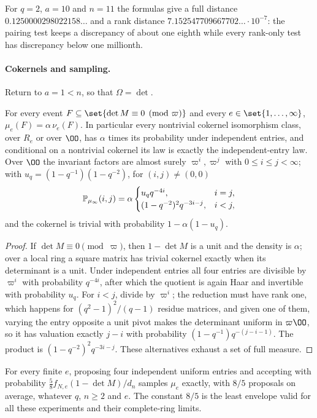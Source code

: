 For $q=2$, $a=10$ and $n=11$ the formulas give a full distance $0.1250000298022158\ldots$ and a
rank distance $7.152547709667702\ldots\cdot10^{-7}$: the pairing test keeps a discrepancy of about
one eighth while every rank-only test has discrepancy below one millionth.

\paragraph{Cokernels and sampling.} Return to $a=1<n$, so that $\Omega=\det$.

\begin{corollary}\label{spn:cor:padic-cokernel}
For every event $F\subseteq\set{\det M\equiv0\pmod\varpi}$ and every $e\in\set{1,\dots,\infty}$,
$\mu_e(F)=\alpha\,\nu_e(F)$. In particular every nontrivial cokernel isomorphism class, over $R_e$
or over $\OO$, has $\alpha$ times its probability under independent entries, and conditional on a
nontrivial cokernel its law is exactly the independent-entry law. Over $\OO$ the invariant factors
are almost surely $\varpi^i,\varpi^j$ with $0\le i\le j<\infty$; with $u_q=(1-q^{-1})(1-q^{-2})$,
for $(i,j)\ne(0,0)$
\[
 \mathbb{P}_{\mu_\infty}(i,j)=\alpha\begin{cases}u_qq^{-4i},&i=j,\\(1-q^{-2})^2q^{-3i-j},&i<j,\end{cases}
\]
and the cokernel is trivial with probability $1-\alpha(1-u_q)$.
\end{corollary}

\begin{proof}
If $\det M\equiv0\pmod\varpi$, then $1-\det M$ is a unit and the density is $\alpha$; over a local
ring a square matrix has trivial cokernel exactly when its determinant is a unit. Under
independent entries all four entries are divisible by $\varpi^i$ with probability $q^{-4i}$, after
which the quotient is again Haar and invertible with probability $u_q$. For $i<j$, divide by
$\varpi^i$; the reduction must have rank one, which happens for $(q^2-1)^2/(q-1)$ residue matrices,
and given one of them, varying the entry opposite a unit pivot makes the determinant uniform in
$\varpi\OO$, so it has valuation exactly $j-i$ with probability $(1-q^{-1})q^{-(j-i-1)}$. The
product is $(1-q^{-2})^2q^{-3i-j}$. These alternatives exhaust a set of full measure.
\end{proof}

\begin{corollary}\label{spn:cor:padic-sampler}
For every finite $e$, proposing four independent uniform entries and accepting with probability
$\frac58f_{N,e}(1-\det M)/d_n$ samples $\mu_e$ exactly, with $8/5$ proposals on average, whatever
$q$, $n\ge2$ and $e$. The constant $8/5$ is the least envelope valid for all these experiments and
their complete-ring limits.
\end{corollary}

